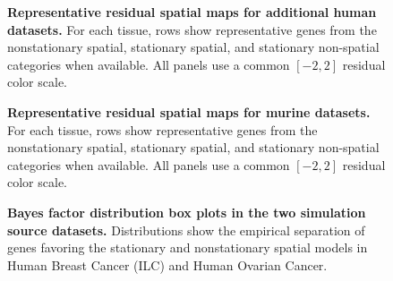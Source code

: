 \begin{landscape}
\begin{figure}[H]
\centering
{}
\caption{\textbf{Representative residual spatial maps for additional human datasets.} For each tissue, rows show representative genes from the nonstationary spatial, stationary spatial, and stationary non-spatial categories when available. All panels use a common \([-2,2]\) residual color scale.}
\label{fig:s2}
\end{figure}
\end{landscape}

\begin{landscape}
\begin{figure}[H]
\centering
{}
\caption{\textbf{Representative residual spatial maps for murine datasets.} For each tissue, rows show representative genes from the nonstationary spatial, stationary spatial, and stationary non-spatial categories when available. All panels use a common \([-2,2]\) residual color scale.}
\label{fig:s3}
\end{figure}
\end{landscape}

\begin{figure}[H]
\centering
{}
\caption{\textbf{Bayes factor distribution box plots in the two simulation source datasets.} Distributions show the empirical separation of genes favoring the stationary and nonstationary spatial models in Human Breast Cancer (ILC) and Human Ovarian Cancer.}
\label{fig:s4}
\end{figure}
